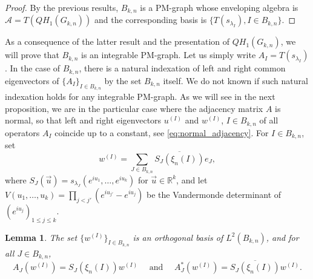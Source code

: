 \documentclass[10pt,11pt]{amsart}%
\newtheorem{lemma}[theorem]{Lemma}
\begin{document}
\begin{proof}
By the previous results, $B_{k,n}$ is a PM-graph whose enveloping algebra is $\mathcal{A}=T(QH_1(G_{k,n}))$ and the corresponding basis is $\{T(s_{\lambda_I}),I\in B_{k,n}\}$.
\end{proof}
As a consequence of the latter result and the presentation of $QH_1(G_{k,n})$, we will prove that $B_{k,n}$ is an integrable PM-graph. Let us simply write $A_{I}=T(s_{\lambda_I})$. In the case of $B_{k,n}$, there is a natural indexation of left and right common eigenvectors of $\{A_I\}_{I\in B_{k,n}}$ by the set $B_{k,n}$ itself. We do not known if such natural indexation holds for any integrable PM-graph. As we will see in the next proposition, we are in the particular case where the adjacency matrix $A$ is normal, so that left and right eigenvectors $u^{(I)}$ and $w^{(I)}$, $I\in B_{k,n}$ of all operators $A_{I}$ coincide up to a constant, see \eqref{eq:normal_adjacency}. For $I\in B_{k,n}$, set
\begin{equation}\label{eq:def_vI}
w^{(I)}=\sum_{J\in B_{k,n}}\overline{S_{J}(\xi_{n}(I))}e_{J},
\end{equation}
where $S_J(\vec{u})=s_{\lambda_J}\left(e^{iu_1},\ldots,e^{iu_k}\right)$  for $\vec{u}\in \mathbb{R}^k$, and let $V(u_1,\ldots,u_k)=\prod_{j<j'}\left(e^{iu_{j'}}-e^{iu_{j}}\right)$ be the Vandermonde determinant of $\left(e^{iu_j}\right)_{1\leq j\leq k}$.  
\begin{lemma}\label{lem:action_s_mu}
The set $\{w^{(I)}\}_{I\in B_{k,n}}$ is an orthogonal basis of $L^2(B_{k,n})$, and for all $J\in B_{k,n}$,
$$A_{J}(w^{(I)})=S_{J}(\xi_{n}(I))w^{(I)}\quad
\text{   and    } \quad A_{J}^*(w^{(I)})=\overline{S_{J}(\xi_{n}(I))}w^{(I)}.$$
\end{lemma}
\end{document}
